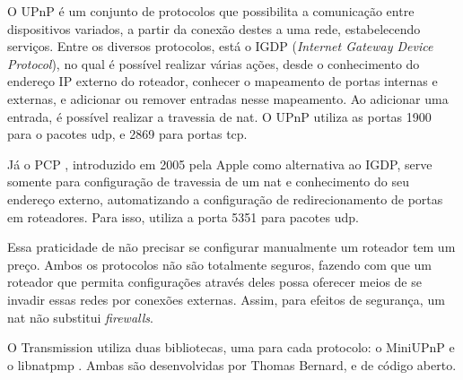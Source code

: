 O UPnP \cite{wiki:upnp} é um conjunto de protocolos que possibilita a comunicação entre
dispositivos variados, a partir da conexão destes a uma rede, estabelecendo serviços.
Entre os diversos protocolos, está o IGDP (\emph{Internet Gateway Device Protocol}), no
qual é possível realizar várias ações, desde o conhecimento do endereço IP externo do
roteador, conhecer o mapeamento de portas internas e externas, e adicionar ou remover
entradas nesse mapeamento. Ao adicionar uma entrada, é possível realizar a travessia de
\gls*{nat}. O UPnP utiliza as portas 1900 para o pacotes \gls*{udp}, e 2869 para portas
\gls*{tcp}.

Já o PCP \cite{wiki:pcp}, introduzido em 2005 pela Apple como alternativa ao IGDP,
serve somente para configuração de travessia de um \gls*{nat} e conhecimento do seu
endereço externo, automatizando a configuração de redirecionamento de portas em
roteadores. Para isso, utiliza a porta 5351 para pacotes \gls*{udp}.

Essa praticidade de não precisar se configurar manualmente um roteador tem um preço.
Ambos os protocolos não são totalmente seguros, fazendo com que um roteador que permita
configurações através deles possa oferecer meios de se invadir essas redes por conexões
externas. Assim, para efeitos de segurança, um \gls*{nat} não substitui \emph{firewalls}.

O Transmission utiliza duas bibliotecas, uma para cada protocolo: o MiniUPnP
\cite{site:miniupnp} e o libnatpmp \cite{site:libnatpmp}. Ambas são desenvolvidas por
Thomas Bernard, e de código aberto.